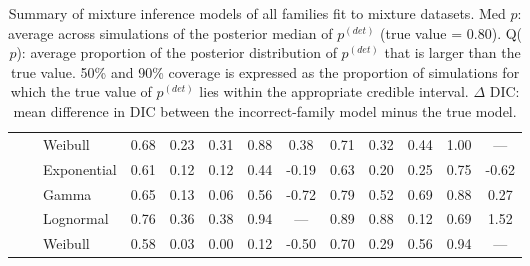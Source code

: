 \documentclass[12pt]{article}
\newcommand{\pdet}{p^{(det)}}
\begin{document}
\begin{table}[ht]
\begin{tabular}{l|l|l|ccccc|ccccc}
& &   Weibull & 0.68 & 0.23 & 0.31 & 0.88 & 0.38 & 0.71 & 0.32 & 0.44 & 1.00 & --- \\ 
\cline{2-13}
& &   Exponential & 0.61 & 0.12 & 0.12 & 0.44 & -0.19 & 0.63 & 0.20 & 0.25 & 0.75 & -0.62 \\ 
\cline{2-13}
& \parbox[t]{2mm}{} & Gamma & 0.65 & 0.13 & 0.06 & 0.56 & -0.72 & 0.79 & 0.52 & 0.69 & 0.88 & 0.27 \\ 
& &   Lognormal & 0.76 & 0.36 & 0.38 & 0.94 & --- & 0.89 & 0.88 & 0.12 & 0.69 & 1.52 \\ 
& &   Weibull & 0.58 & 0.03 & 0.00 & 0.12 & -0.50 & 0.70 & 0.29 & 0.56 & 0.94 & --- \\ 
   \hline
\end{tabular}
\caption{Summary of mixture inference models of all families fit to mixture datasets.  
Med $p$: average across simulations of the posterior median of $\pdet$ (true value = 0.80).  
Q($p$): average proportion of the posterior distribution of $\pdet$ that is larger than the true value.  
50\% and 90\% coverage is expressed as the proportion of simulations for which the true value of $\pdet$ lies within the appropriate credible interval.  
$\Delta$ DIC: mean difference in DIC between the incorrect-family model minus the true model.}
\label{tbl:sim2}
\end{table}

\else
\end{document}

